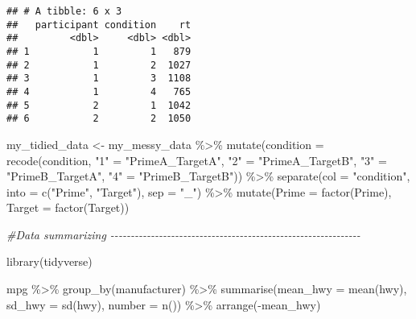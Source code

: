 \documentclass[
]{article}
\newenvironment{Shaded}{\begin{snugshade}}{\end{snugshade}}
\newcommand{\AttributeTok}[1]{\textcolor[rgb]{0.77,0.63,0.00}{#1}}
\newcommand{\CommentTok}[1]{\textcolor[rgb]{0.56,0.35,0.01}{\textit{#1}}}
\newcommand{\FunctionTok}[1]{\textcolor[rgb]{0.00,0.00,0.00}{#1}}
\newcommand{\NormalTok}[1]{#1}
\newcommand{\OtherTok}[1]{\textcolor[rgb]{0.56,0.35,0.01}{#1}}
\newcommand{\SpecialCharTok}[1]{\textcolor[rgb]{0.00,0.00,0.00}{#1}}
\newcommand{\StringTok}[1]{\textcolor[rgb]{0.31,0.60,0.02}{#1}}
\begin{document}
\begin{verbatim}
## # A tibble: 6 x 3
##   participant condition    rt
##         <dbl>     <dbl> <dbl>
## 1           1         1   879
## 2           1         2  1027
## 3           1         3  1108
## 4           1         4   765
## 5           2         1  1042
## 6           2         2  1050
\end{verbatim}

\begin{Shaded}
\begin{Highlighting}[]
\NormalTok{my\_tidied\_data }\OtherTok{\textless{}{-}}\NormalTok{ my\_messy\_data }\SpecialCharTok{\%\textgreater{}\%}
  \FunctionTok{mutate}\NormalTok{(}\AttributeTok{condition =} \FunctionTok{recode}\NormalTok{(condition,}
                            \StringTok{"1"} \OtherTok{=} \StringTok{"PrimeA\_TargetA"}\NormalTok{,}
                            \StringTok{"2"} \OtherTok{=} \StringTok{"PrimeA\_TargetB"}\NormalTok{,}
                            \StringTok{"3"} \OtherTok{=} \StringTok{"PrimeB\_TargetA"}\NormalTok{,}
                            \StringTok{"4"} \OtherTok{=} \StringTok{"PrimeB\_TargetB"}\NormalTok{)) }\SpecialCharTok{\%\textgreater{}\%}
  \FunctionTok{separate}\NormalTok{(}\AttributeTok{col =} \StringTok{"condition"}\NormalTok{, }\AttributeTok{into =} \FunctionTok{c}\NormalTok{(}\StringTok{"Prime"}\NormalTok{, }\StringTok{"Target"}\NormalTok{), }\AttributeTok{sep =} \StringTok{"\_"}\NormalTok{) }\SpecialCharTok{\%\textgreater{}\%}
  \FunctionTok{mutate}\NormalTok{(}\AttributeTok{Prime =} \FunctionTok{factor}\NormalTok{(Prime), }\AttributeTok{Target =} \FunctionTok{factor}\NormalTok{(Target))}


\CommentTok{\#Data summarizing {-}{-}{-}{-}{-}{-}{-}{-}{-}{-}{-}{-}{-}{-}{-}{-}{-}{-}{-}{-}{-}{-}{-}{-}{-}{-}{-}{-}{-}{-}{-}{-}{-}{-}{-}{-}{-}{-}{-}{-}{-}{-}{-}{-}{-}{-}{-}{-}{-}{-}{-}{-}{-}{-}{-}{-}{-}{-}{-}{-}{-}{-}}

\FunctionTok{library}\NormalTok{(tidyverse)}

\NormalTok{mpg }\SpecialCharTok{\%\textgreater{}\%}
  \FunctionTok{group\_by}\NormalTok{(manufacturer) }\SpecialCharTok{\%\textgreater{}\%}
  \FunctionTok{summarise}\NormalTok{(}\AttributeTok{mean\_hwy =} \FunctionTok{mean}\NormalTok{(hwy), }\AttributeTok{sd\_hwy =} \FunctionTok{sd}\NormalTok{(hwy), }\AttributeTok{number =} \FunctionTok{n}\NormalTok{()) }\SpecialCharTok{\%\textgreater{}\%}
  \FunctionTok{arrange}\NormalTok{(}\SpecialCharTok{{-}}\NormalTok{mean\_hwy)}
\end{Highlighting}
\end{Shaded}
\end{document}
